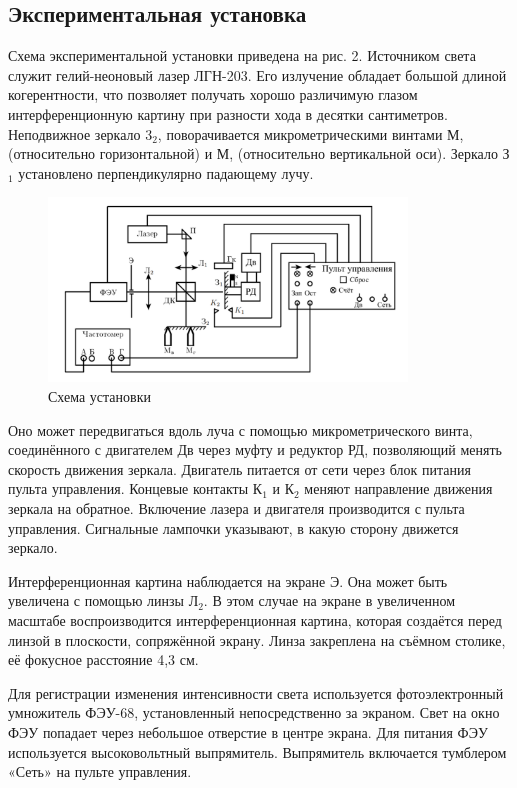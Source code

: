 \documentclass[a4paper,12pt]{article}
\begin{document}
	\subsection*{Экспериментальная установка}
	Схема экспериментальной установки приведена на рис. 2. Источником света служит гелий-неоновый лазер ЛГН-203. Его излучение обладает большой длиной когерентности, что позволяет получать хорошо различимую глазом интерференционную картину при разности хода в десятки сантиметров. Неподвижное зеркало 3$_2$, поворачивается микрометрическими винтами М, (относительно горизонтальной) и М, (относительно вертикальной оси). Зеркало З$_1$ установлено перпендикулярно падающему лучу.
	\begin{figure}[h]
		\begin{center}
			\includegraphics[width = 0.85\textwidth]{424-2.png}
			\caption{Схема установки}
		\end{center}
	\end{figure}
	 Оно может передвигаться вдоль луча с помощью микрометрического винта, соединённого с двигателем Дв через муфту и редуктор РД, позволяющий менять скорость движения зеркала. Двигатель питается от сети через блок питания пульта управления. Концевые контакты К$_1$ и К$_2$ меняют направление движения зеркала на обратное. Включение лазера и двигателя производится с пульта управления. Сигнальные лампочки указывают, в какую сторону движется зеркало.
	 
	 Интерференционная картина наблюдается на экране Э. Она может быть увеличена с помощью линзы Л$_2$. В этом случае на экране в увеличенном масштабе воспроизводится интерференционная картина, которая создаётся перед линзой в плоскости, сопряжённой экрану. Линза закреплена на съёмном столике, её фокусное расстояние 4,3 см.
	 
	 Для регистрации изменения интенсивности света используется фотоэлектронный умножитель ФЭУ-68, установленный непосредственно за экраном. Свет на окно ФЭУ попадает через небольшое отверстие в центре экрана. Для питания ФЭУ используется высоковольтный выпрямитель. Выпрямитель включается тумблером «Сеть» на пульте управления.
	 
\end{document}
